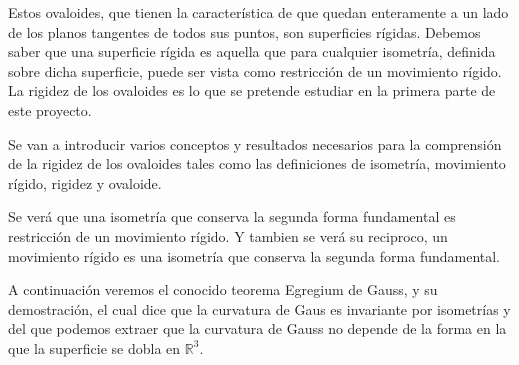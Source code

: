 





Estos ovaloides, que tienen la característica de que quedan enteramente a un lado de los planos tangentes de todos sus puntos, son superficies rígidas. Debemos saber que una superficie rígida es aquella que para cualquier isometría, definida sobre dicha superficie, puede ser vista como restricción de un movimiento rígido. La rigidez de los ovaloides es lo que se pretende estudiar en la primera parte de este proyecto.

Se van a introducir varios conceptos y resultados necesarios para la comprensión de la rigidez de los ovaloides tales como las definiciones de isometría, movimiento rígido, rigidez y ovaloide.

Se verá que una isometría que conserva la segunda forma fundamental es restricción de un movimiento rígido. Y tambien se verá su reciproco, un movimiento rígido es una isometría que conserva la segunda forma fundamental.

A continuación veremos el conocido teorema Egregium de Gauss, y su demostración, el cual dice que la curvatura de Gaus es invariante por isometrías y del que podemos extraer que la curvatura de Gauss no depende de la forma en la que la superficie se dobla en $\mathbb{R}^3$.

